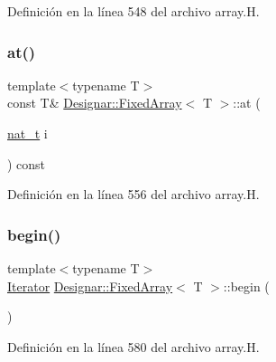 Definición en la línea 548 del archivo array.\+H.

\mbox{\label{class_designar_1_1_fixed_array_a3a1dec650628273bf08b6656db0a9088}} 
\subsubsection{\texorpdfstring{at()}{at()}\hspace{0.1cm}{\footnotesize\ttfamily [2/2]}}
{\footnotesize\ttfamily template$<$typename T$>$ \\
const T\& \hyperlink{class_designar_1_1_fixed_array}{Designar\+::\+Fixed\+Array}$<$ T $>$\+::at (\begin{DoxyParamCaption}\item[{\hyperlink{namespace_designar_aa72662848b9f4815e7bf31a7cf3e33d1}{nat\+\_\+t}}]{i }\end{DoxyParamCaption}) const\hspace{0.3cm}{\ttfamily [inline]}}



Definición en la línea 556 del archivo array.\+H.

\mbox{\label{class_designar_1_1_fixed_array_a40c099038e41c839acca94bf352753fc}} 
\subsubsection{\texorpdfstring{begin()}{begin()}\hspace{0.1cm}{\footnotesize\ttfamily [1/2]}}
{\footnotesize\ttfamily template$<$typename T$>$ \\
\hyperlink{class_designar_1_1_fixed_array_1_1_iterator}{Iterator} \hyperlink{class_designar_1_1_fixed_array}{Designar\+::\+Fixed\+Array}$<$ T $>$\+::begin (\begin{DoxyParamCaption}{ }\end{DoxyParamCaption})\hspace{0.3cm}{\ttfamily [inline]}}



Definición en la línea 580 del archivo array.\+H.

